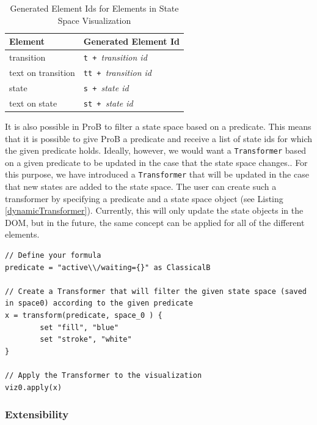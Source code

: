 \begin{table}[h!]
\caption{Generated Element Ids for Elements in State Space Visualization}
\label{tab:elements}
\begin{center}
\begin{tabular}{ | l | l | }
\hline
\textbf{Element} & \textbf{Generated Element Id} \\ \hline \hline
transition & \texttt{t + }\emph{transition id} \\ \hline
text on transition & \texttt{tt + }\emph{transition id} \\ \hline
state & \texttt{s + }\emph{state id} \\ \hline
text on state & \texttt{st + }\emph{state id} \\ \hline
\end{tabular}
\end{center}
\end{table}

It is also possible in ProB to filter a state space based on a predicate. This means that it is possible to give ProB a predicate and receive a list of state ids for which the given predicate holds. Ideally, however, we would want a \texttt{Transformer} based on a given predicate to be updated in the case that the state space changes.. For this purpose, we have introduced a \texttt{Transformer} that will be updated in the case that new states are added to the state space. The user can create such a transformer by specifying a predicate and a state space object (see Listing \ref{dynamicTransformer}). Currently, this will only update the state objects in the DOM, but in the future, the same concept can be applied for all of the different elements. 

\begin{lstlisting}[caption=Create a \texttt{Transformer} based on the states that match a given predicate,label=dynamicTransformer]
// Define your formula
predicate = "active\\/waiting={}" as ClassicalB

// Create a Transformer that will filter the given state space (saved in space0) according to the given predicate
x = transform(predicate, space_0 ) {
		set "fill", "blue"
		set "stroke", "white"
}

// Apply the Transformer to the visualization
viz0.apply(x)
\end{lstlisting}

\subsubsection{Extensibility}

